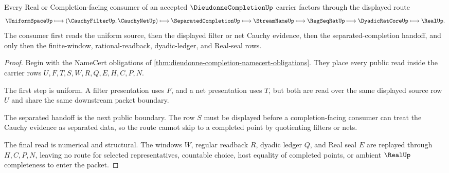 \begin{theorem}
\label{thm:dieudonne-completion-uniform-handoff}
Every Real or Completion-facing consumer of an accepted $\DieudonneCompletionUp$ carrier factors through the displayed route
$$
\UniformSpaceUp \longmapsto (\CauchyFilterUp,\CauchyNetUp) \longmapsto \SeparatedCompletionUp \longmapsto \StreamNameUp \longmapsto \RegSeqRatUp \longmapsto \DyadicRatCoreUp \longmapsto \RealUp .
$$
The consumer first reads the uniform source, then the displayed filter or net Cauchy evidence, then the separated-completion handoff, and only then the finite-window, rational-readback, dyadic-ledger, and Real-seal rows.
\end{theorem}
\begin{proof}
Begin with the NameCert obligations of \autoref{thm:dieudonne-completion-namecert-obligations}. They place every public read inside the carrier rows $U,F,T,S,W,R,Q,E,H,C,P,N$.

The first step is uniform. A filter presentation uses $F$, and a net presentation uses $T$, but both are read over the same displayed source row $U$ and share the same downstream packet boundary.

The separated handoff is the next public boundary. The row $S$ must be displayed before a completion-facing consumer can treat the Cauchy evidence as separated data, so the route cannot skip to a completed point by quotienting filters or nets.

The final read is numerical and structural. The windows $W$, regular readback $R$, dyadic ledger $Q$, and Real seal $E$ are replayed through $H,C,P,N$, leaving no route for selected representatives, countable choice, host equality of completed points, or ambient $\RealUp$ completeness to enter the packet.
\end{proof}



